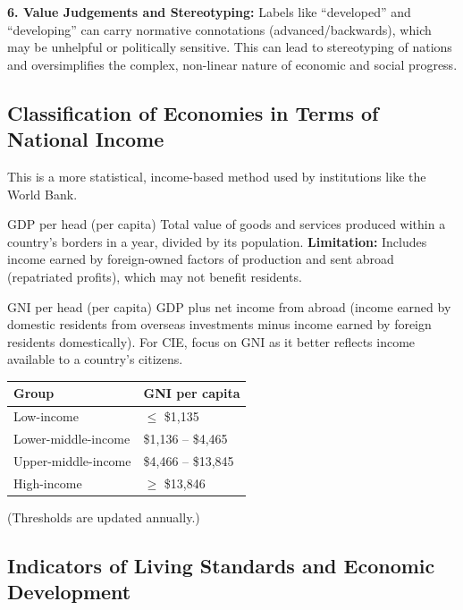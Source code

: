 \documentclass[11pt, a4paper, twoside]{book}
\begin{document}
\textbf{6. Value Judgements and Stereotyping:} Labels like ``developed'' and ``developing'' can carry normative connotations (advanced/backwards), which may be unhelpful or politically sensitive. This can lead to stereotyping of nations and oversimplifies the complex, non-linear nature of economic and social progress.

\subsection{Classification of Economies in Terms of National Income}

This is a more statistical, income-based method used by institutions like the World Bank.

\begin{keyterm}{GDP per head (per capita)}
Total value of goods and services produced within a country's borders in a year, divided by its population. \textbf{Limitation:} Includes income earned by foreign-owned factors of production and sent abroad (repatriated profits), which may not benefit residents.
\end{keyterm}

\begin{keyterm}{GNI per head (per capita)}
GDP plus net income from abroad (income earned by domestic residents from overseas investments minus income earned by foreign residents domestically). For CIE, focus on GNI as it better reflects income available to a country's citizens.
\end{keyterm}

\begin{example}
\begin{tabular}{@{}ll@{}}
\textbf{Group} & \textbf{GNI per capita} \\
\midrule
Low-income & $\leq$ \$1,135 \\
Lower-middle-income & \$1,136 -- \$4,465 \\
Upper-middle-income & \$4,466 -- \$13,845 \\
High-income & $\geq$ \$13,846 \\
\end{tabular}

(Thresholds are updated annually.)
\end{example}

\subsection{Indicators of Living Standards and Economic Development}
\end{document}
